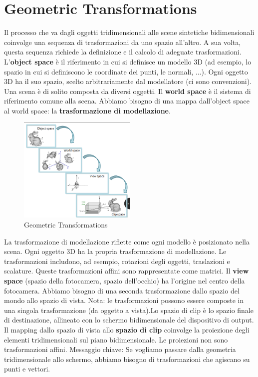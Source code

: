\section{Geometric Transformations}
Il processo che va dagli oggetti tridimensionali alle scene sintetiche bidimensionali coinvolge una sequenza di trasformazioni da uno spazio all'altro. A sua volta, questa sequenza richiede la definizione e il calcolo di adeguate trasformazioni.
L'\textbf{object space} è il riferimento in cui si definisce un modello 3D (ad esempio, lo spazio in cui si definiscono le coordinate dei punti, le normali, ...). Ogni oggetto 3D ha il suo spazio, scelto arbitrariamente dal modellatore (ci sono convenzioni).
Una scena è di solito composta da diversi oggetti. Il \textbf{world space} è il sistema di riferimento comune alla scena.
Abbiamo bisogno di una mappa dall'object space al world space: la \textbf{trasformazione di modellazione}.
\begin{figure}[H]
    \centering
    \includegraphics[width=0.5\textwidth]{images/SpaceObject.png} 
    \caption{Geometric Transformations}
    \label{fig:immagine}
\end{figure}
La trasformazione di modellazione riflette come ogni modello è posizionato nella scena. Ogni oggetto 3D ha la propria trasformazione di modellazione. Le trasformazioni includono, ad esempio, rotazioni degli oggetti, traslazioni e scalature. Queste trasformazioni affini sono rappresentate come matrici.
Il \textbf{view space} (spazio della fotocamera, spazio dell'occhio) ha l'origine nel centro della fotocamera. Abbiamo bisogno di una seconda trasformazione dallo spazio del mondo allo spazio di vista.
Nota: le trasformazioni possono essere composte in una singola trasformazione (da oggetto a vista).Lo spazio di clip è lo spazio finale di destinazione, allineato con lo schermo bidimensionale del dispositivo di output. Il mapping dallo spazio di vista allo \textbf{spazio di clip} coinvolge la proiezione degli elementi tridimensionali sul piano bidimensionale. Le proiezioni non sono trasformazioni affini.
Messaggio chiave: Se vogliamo passare dalla geometria tridimensionale allo schermo, abbiamo bisogno di trasformazioni che agiscano su punti e vettori.
